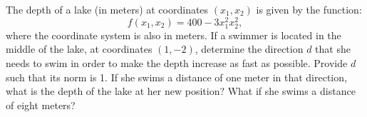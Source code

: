
The depth of a lake (in meters) at coordinates $(x_1,x_2)$ is given by the
function:
\[
f(x_1,x_2)=400-3x_1^2x_2^2,
\]
where the coordinate system is also in meters.
If a swimmer is located in the middle of the lake, at coordinates
$(1,-2)$, determine the direction $d$ that she needs to swim in order to make
the depth increase as fast as possible. Provide $d$ such that its
norm is 1. If she swims a distance of one meter in that direction,
what is the depth of the lake at her new position? What if she swims a
distance of eight meters? 




